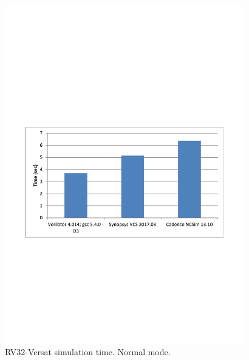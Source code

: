 \begin{figure}[!htb]
	\centering
	\includegraphics[trim=0 250 0 290 , clip, width=0.93\textwidth]{Figures/benchmark.pdf}
	\caption{RV32-Versat simulation time. Normal mode.}
	\label{fig:benchmark}
\end{figure}

